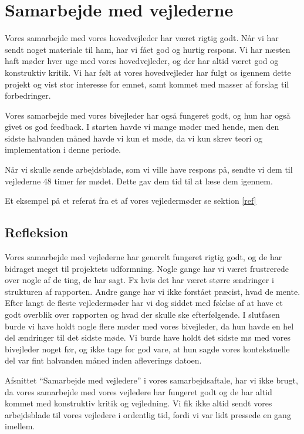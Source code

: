 \section{Samarbejde med vejlederne}
\label{H8R}

Vores samarbejde med vores hovedvejleder har v\ae{}ret rigtig godt. 
N\aa{}r vi har sendt noget materiale til ham, har vi f\aa{}et god og hurtig respons. 
Vi har n\ae{}sten haft m\o{}der hver uge med vores hovedvejleder, og der har altid v\ae{}ret god og
konstruktiv kritik. 
Vi har f\o{}lt at vores hovedvejleder har fulgt os igennem dette projekt og vist stor interesse for emnet, samt kommet med masser af forslag til forbedringer.

Vores samarbejde med vores bivejleder har ogs\aa{} fungeret godt, og hun har ogs\aa{} givet os god feedback. 
I starten havde vi mange m\o{}der med hende, men den sidste halvanden m\aa{}ned havde vi kun et m\o{}de, da vi kun skrev teori og implementation i denne periode.

N\aa{}r vi skulle sende arbejdsblade, som vi ville have respons p\aa{}, sendte vi dem til vejlederne 48 timer f\o{}r m\o{}det. Dette gav dem tid til at l\ae{}se dem igennem.

Et eksempel p\aa{} et referat fra et af vores vejlederm\o{}der se sektion \ref{ref}

\subsection{Refleksion}
Vores samarbejde med vejlederne har generelt fungeret rigtig godt, og de har bidraget meget til projektets udformning. 
Nogle gange har vi v\ae{}ret frustrerede over nogle af de ting, de har sagt. 
Fx hvis det har v\ae{}ret st\o{}rre \ae{}ndringer i strukturen af rapporten. Andre gange har vi ikke forst\aa{}et pr\ae{}cist, hvad de
mente. 
Efter langt de fleste vejlederm\o{}der har vi dog siddet med f\o{}lelse af at have et godt overblik over rapporten og hvad der skulle ske efterf\o{}lgende. 
I slutfasen burde vi have holdt nogle flere m\o{}der med vores bivejleder, da hun havde en hel del \ae{}ndringer til det sidste m\o{}de. Vi burde have holdt det sidste m\o{} med vores bivejleder noget f\o{}r, og ikke tage for god vare, at hun sagde vores kontekstuelle del var fint halvanden m\aa{}ned inden afleverings datoen.


Afsnittet ``Samarbejde med vejledere'' i vores samarbejdsaftale, har vi ikke brugt, da vores samarbejde med vores vejledere har fungeret godt og de har altid kommet med konstruktiv kritik og vejledning. 
Vi fik ikke altid sendt vores arbejdsblade til vores vejledere i ordentlig tid, fordi vi var lidt pressede en gang imellem.


